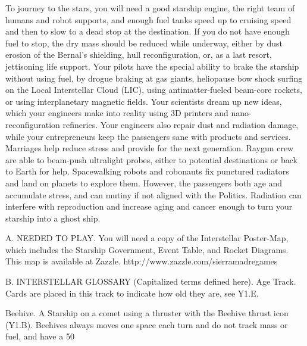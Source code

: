 \documentclass[a4paper]{book}
\begin{document}
To journey to the stars, you will need a good starship engine, the right team of humans and robot supports, and enough fuel tanks speed up to cruising speed and then to slow to a dead stop at the destination. If you do not have enough fuel to stop, the dry mass should be reduced while underway, either by dust erosion of the Bernal’s shielding, hull reconfiguration, or, as a last resort, jettisoning life support. Your pilots have the special ability to brake the starship without using fuel, by drogue braking at gas giants, heliopause bow shock surfing on the Local Interstellar Cloud (LIC), using antimatter-fueled beam-core rockets, or using interplanetary magnetic fields. Your scientists dream up new ideas, which your engineers make into reality using 3D printers and nano-reconfiguration refineries. Your engineers also repair dust and radiation damage, while your entrepreneurs keep the passengers sane with products and services. Marriages help reduce stress and provide for the next generation. Raygun crew are able to beam-push ultralight probes, either to potential destinations or back to Earth for help. Spacewalking robots and robonauts fix punctured radiators and land on planets to explore them. However, the passengers both age and accumulate stress, and can mutiny if not aligned with the Politics. Radiation can interfere with reproduction and increase aging and cancer enough to turn your starship into a ghost ship.
 
A. NEEDED TO PLAY.
You will need a copy of the Interstellar Poster-Map, which includes the Starship Government, Event Table, and Rocket Diagrams. This map is available at Zazzle. http://www.zazzle.com/sierramadregames
 
B. INTERSTELLAR GLOSSARY (Capitalized terms defined here).
Age Track. Cards are placed in this track to indicate how old they are, see Y1.E.

Beehive. A Starship on a comet using a thruster with the Beehive thrust icon (Y1.B). Beehives always moves one space each turn and do not track mass or fuel, and have a 50%
 
\end{document}
